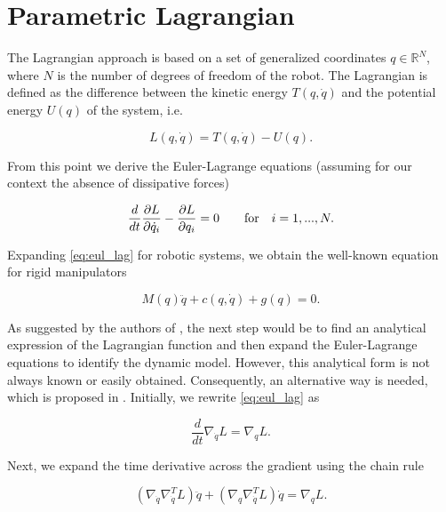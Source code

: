 \documentclass[a4paper]{article}
\begin{document}
\section{Parametric Lagrangian}
\label{sec:parmlag}
The Lagrangian approach is based on a set of generalized coordinates $q\in\mathbb{R}^N$, where $N$ is the number of degrees of freedom of the robot. The Lagrangian is defined as the difference between the kinetic energy $T(q,\dot{q})$ and the potential energy $U(q)$ of the system, i.e.

\begin{equation}
    \nonumber
    L(q,\dot{q}) = T(q,\dot{q}) - U(q).
\end{equation}

From this point we derive the Euler-Lagrange equations (assuming for our context the absence of dissipative forces)

\begin{equation}
    \label{eq:eul_lag}
    \frac{d}{dt}\frac{\partial L}{\partial \dot{q}_i} - \frac{\partial L}{\partial q_i} = 0\qquad\textnormal{for} \quad i=1,...,N.
\end{equation}

Expanding \eqref{eq:eul_lag} for robotic systems, we obtain the well-known equation for rigid manipulators

\begin{equation}
    \nonumber
    M(q)\ddot{q} + c(q,\dot{q}) + g(q) = 0.
\end{equation}

As suggested by the authors of \cite{lnncranmer}, the next step would be to find an analytical expression of the Lagrangian function and then expand the Euler-Lagrange equations to identify the dynamic model. However, this analytical form is not always known or easily obtained. Consequently, an alternative way is needed, which is proposed in \cite{lnncranmer}. Initially, we rewrite \eqref{eq:eul_lag} as

\begin{equation}
    \nonumber
    \frac{d}{dt}\nabla_{\dot{q}} L = \nabla_{q} L.
\end{equation}

Next, we expand the time derivative across the gradient using the chain rule

\begin{equation}
    \nonumber
    (\nabla_{\dot{q}}\nabla_{\dot{q}}^T L)\ddot{q} + (\nabla_{q}\nabla_{\dot{q}}^T L)\dot{q} = \nabla_{q} L.
\end{equation}
\end{document}
